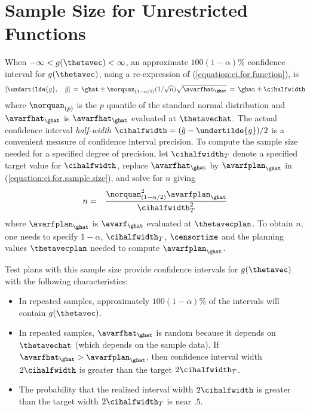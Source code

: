 \section{Sample Size for Unrestricted Functions}
\label{section:sample.size.unrest}
When $-\infty< g(\thetavec)<\infty$, an approximate
$100(1-\alpha)\%$ confidence interval for $g(\thetavec)$, using a
re-expression of (\ref{equation:ci.for.function}), is
\begin{equation}
\label{equation:ci.for.sample.size}
 [\undertilde{g}, \quad  \tilde{g}] \,= \,
\ghat \pm 
\norquan_{(1-\alpha/2)}(1/\sqrt{n})\sqrt{\avarfhat_{\ghat}}
\, = \, \ghat \pm \cihalfwidth 
\end{equation}
where $\norquan_{(p)}$ is the $p$ quantile of the standard normal
distribution and $\avarfhat_{\ghat}$ is $\avarfhat_{\ghat}$ evaluated at
$\thetavechat$. The actual confidence interval {\em half-width}
$\cihalfwidth=(\tilde{g}-\undertilde{g})/2$ is a convenient measure
of confidence interval precision.  To compute the sample size needed
for a specified degree of precision, let $\cihalfwidth_{T}$ denote a
specified target value for $\cihalfwidth$, replace
$\avarfhat_{\ghat}$ by $\avarfplan_{\ghat}$ in
(\ref{equation:ci.for.sample.size}), and solve for $n$ giving
\begin{eqnarray}
\label{equation:m.for.unrest}
n&=&\frac{\norquan_{(1-\alpha/2)}^{2}
\avarfplan_{\ghat}}{\cihalfwidth_{T}^{2}}
\end{eqnarray}
where $\avarfplan_{\ghat}$ is $\avarf_{\ghat}$ evaluated at
$\thetavecplan$.  To obtain $n$, one needs to specify $1-\alpha$,
$\cihalfwidth_{T}$, $\censortime$ and the planning values
$\thetavecplan$ needed to compute $\avarfplan_{\ghat}$.

Test plans with this sample size provide confidence
intervals for $g(\thetavec)$ with the following characteristics:
\begin{itemize} 
\item 	
In repeated samples, approximately $100(1-\alpha)\%$ of the intervals
will contain $g(\thetavec)$.
\item
In repeated samples, $\avarfhat_{\ghat}$ is random because it 
depends on $\thetavechat$ (which depends on the sample data). If
$\avarfhat_{\ghat}> \avarfplan_{\ghat}$, then confidence interval width
$2 \cihalfwidth$ is greater than the target $2 \cihalfwidth_{T}$.
\item 
The probability that the realized interval width $2\cihalfwidth$ is greater than 
the target width $2
\cihalfwidth_{T}$ is near $.5$.
\end{itemize}

